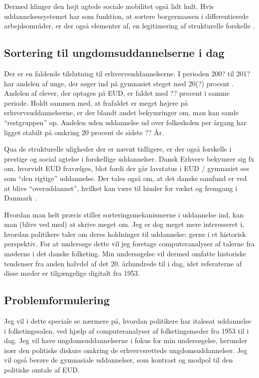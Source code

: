 Dermed klinger den højt agtede sociale mobilitet også lidt hult.
Hvis uddannelsessystemet har som funktion, at sortere borgermassen i differentierede arbejdsområder, er der også elementer af, en legitimering af strukturelle forskelle .


\subsection{Sortering til ungdomsuddannelserne i dag}
\label{sec:sorting}
Der er en faldende tilslutning til erhvervsuddannelserne.
I perioden 200? til 201? har andelen af unge, der søger ind på gymnasiet steget med 20(?) procent .
Andelen af elever, der optages på EUD, er faldet med ?? procent i samme periode.
Holdt sammen med, at frafaldet er meget højere på erhvervsuddannelserne, er der blandt andet bekymringer om, man kan samle “restgruppen” op. Andelen uden uddannelse ud over folkeskolen per årgang har ligget stabilt på omkring 20 procent de sidste ?? År.

Qua de strukturelle uligheder der er nævnt tidligere, er der også forskelle i prestige og social agtelse i forskellige uddannelser.
Dansk Erhverv bekymrer sig fx om, hvorvidt EUD fravælges, blot fordi der går lavstatus i EUD / gymnasiet ses som “den rigtige” uddannelse.
Der tales også om, at det danske samfund er ved at blive “overuddannet”, hvilket kan være til hinder for vækst og fremgang i Danmark \autocite{simonsenLadOsGore2016}.

Hvordan man helt præcis stiller sorteringsmekanismerne i uddannelse ind, kan man (blive ved med) at skrive meget om.
Jeg er dog meget mere interesseret i, hvordan politikere taler om deres holdninger til uddannelse; gerne i et historisk perspektiv.
For at undersøge dette vil jeg foretage computeranalyser af talerne fra møderne i det danske folketing.
Min undersøgelse vil dermed omfatte historiske tendenser fra anden halvdel af det 20. århundrede til i dag, idet referaterne af disse møder er tilgængelige digitalt fra 1953.

\subsection{Problemformulering}
\label{sec:pf}
Jeg vil i dette speciale se nærmere på, hvordan politikere har italesat uddannelse i folketingssalen, ved hjælp af computeranalyser af folketingsmøder fra 1953 til i dag.
Jeg vil have ungdomsuddannelserne i fokus for min undersøgelse, herunder især den politiske diskurs omkring de erhvervsrettede ungdomsuddannelser.
Jeg vil også berøre de gymnasiale uddannelser, som kontrast og modpol til den politiske omtale af EUD.

